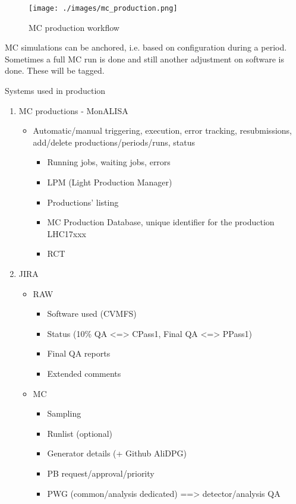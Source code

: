 \begin{figure}[h]
  \begin{center}
    \texttt{[image: ./images/mc\_production.png]}
    \caption{MC production workflow}
    \label{fig:}
  \end{center}
\end{figure}

MC simulations can be anchored, i.e. based on configuration during a period. Sometimes a full MC run is done and still another adjustment on software is done. These will be tagged. 

Systems used in production
\begin{enumerate}
  \item MC productions - MonALISA
  \begin{itemize}
    \item Automatic/manual triggering, execution, error tracking, resubmissions, add/delete productions/periods/runs, status
    \begin{itemize}
      \item Running jobs, waiting jobs, errors
      \item LPM (Light Production Manager)
      \item Productions’ listing
      \item MC Production Database, unique identifier for the production LHC17xxx 
    \item RCT
    \end{itemize}
  \end{itemize}
  \item JIRA
  \begin{itemize}
    \item RAW
    \begin{itemize}
      \item Software used (CVMFS)
      \item Status (10\% QA <=> CPass1, Final QA <=> PPass1)
      \item Final QA reports
      \item Extended comments
    \end{itemize}
    \item MC
    \begin{itemize}
      \item Sampling
      \item Runlist (optional)
      \item Generator details (+ Github AliDPG)
      \item PB request/approval/priority
      \item PWG (common/analysis dedicated) ==> detector/analysis QA

\end{itemize}
\end{itemize}
\end{enumerate}
